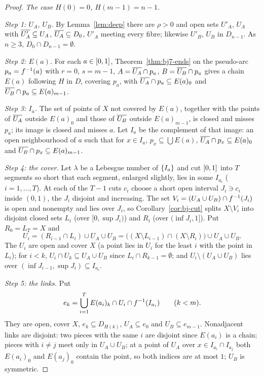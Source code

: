 \begin{proof}
\emph{The case $H(0)=0$, $H(m-1)=n-1$.}

\emph{Step 1: $U_A$, $U_B$.} By Lemma~\ref{lem:deep} there are $\rho>0$ and open sets $U'_A$, $U_A$ with $\overline{U'_A}\subseteq U_A$, $\overline{U_A}\subseteq D_0$, $U'_A$ meeting every
fibre; likewise $U'_B$, $U_B$ in $D_{n-1}$. As $n\ge3$, $D_0\cap D_{n-1}=\emptyset$.

\emph{Step 2: $E(a)$.} For each $a\in[0,1]$, Theorem~\ref{thm:bj7-ends} on the pseudo-arc $p_a=f^{-1}(a)$ with $r=0$, $s=m-1$, $A=\overline{U_A}\cap p_a$, $B=\overline{U_B}\cap p_a$ gives a chain
$E(a)$ following $H$ in $D$, covering $p_a$, with $\overline{U_A}\cap p_a\subseteq E(a)_0$ and $\overline{U_B}\cap p_a\subseteq E(a)_{m-1}$.

\emph{Step 3: $I_a$.} The set of points of $X$ not covered by $E(a)$, together with the points of $\overline{U_A}$ outside $E(a)_0$ and those of $\overline{U_B}$ outside $E(a)_{m-1}$, is
closed and misses $p_a$; its image is closed and misses $a$. Let $I_a$ be the complement of that image: an open neighbourhood of $a$ such that for $x\in I_a$,
$p_x\subseteq\bigcup E(a)$, $\overline{U_A}\cap p_x\subseteq E(a)_0$ and $\overline{U_B}\cap p_x\subseteq E(a)_{m-1}$.

\emph{Step 4: the cover.} Let $\lambda$ be a Lebesgue number of $\left\{ I_a \right\}$ and cut $[0,1]$ into $T$ segments so short that each segment, enlarged slightly, lies in some
$I_{a_i}$ ($i=1,\dots,T$). At each of the $T-1$ cuts $c_i$ choose a short open interval $J_i\ni c_i$ inside $(0,1)$, the $J_i$ disjoint and increasing. The set
$V_i=(U_A\cup U_B)\cap f^{-1}(J_i)$ is open and nonempty and lies over $J_i$, so Corollary~\ref{cor:bj-cut} splits $X\setminus V_i$ into disjoint closed sets $L_i$ (over
$[0,\sup J_i)$) and $R_i$ (over $(\inf J_i,1]$). Put $R_0=L_T=X$ and
\[
U_i=(R_{i-1}\cap L_i)\cup U_A\cup U_B=\bigl((X\setminus L_{i-1})\cap(X\setminus R_i)\bigr)\cup U_A\cup U_B .
\]
The $U_i$ are open and cover $X$ (a point lies in $U_i$ for the least $i$ with the point in $L_i$); for $i<k$, $U_i\cap U_k\subseteq U_A\cup U_B$ since $L_i\cap
R_{k-1}=\emptyset$; and $U_i\setminus(U_A\cup U_B)$ lies over $(\inf J_{i-1},\sup J_i)\subseteq I_{a_i}$.

\emph{Step 5: the links.} Put
\[
e_k=\bigcup_{i=1}^T E(a_i)_k\cap U_i\cap f^{-1}(I_{a_i})\qquad(k<m).
\]
They are open, cover $X$, $e_k\subseteq D_{H(k)}$, $U_A\subseteq e_0$ and $U_B\subseteq e_{m-1}$. Nonadjacent links are disjoint: two pieces with the same $i$ are disjoint since
$E(a_i)$ is a chain; pieces with $i\neq j$ meet only in $U_A\cup U_B$; at a point of $U_A$ over $x\in I_{a_i}\cap I_{a_j}$ both $E(a_i)_0$ and $E(a_j)_0$ contain the point,
so both indices are at most $1$; $U_B$ is symmetric.


\end{proof}
